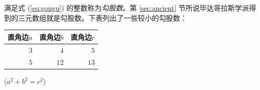 \documentclass[UTF8,a6paper]{ctexart}
\begin{document}
满足式 (\ref{eq:gougu}) 的整数称为\emph{勾股数}。第 \ref{sec:ancient} 节所说毕达哥拉斯学派得到的三元数组就是勾股数。下表列出了一些较小的勾股数：
\begin{table}[H]
\begin{tabular}{|rrr|} \hline
直角边$a$ &  直角边$b$ & 直角边$c$\\\hline
$3$ & $4$ & $5$\\
$5$ & $12$ & $13$\\\hline
\end{tabular}
\qquad
($a^2+b^2=c^2$)
\end{table}



\nocite{shiye_geometrythm_1986}

\end{document}
